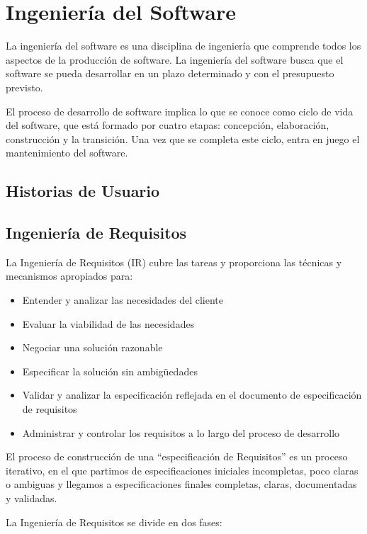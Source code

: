 \chapter{Ingeniería del Software}

La ingeniería del software es una disciplina de ingeniería que comprende todos los aspectos de la producción de software. La ingeniería del software busca que el software se pueda desarrollar en un plazo determinado y con el presupuesto previsto.

El proceso de desarrollo de software implica lo que se conoce como ciclo de vida del software, que está formado por cuatro etapas: concepción, elaboración, construcción y la transición. Una vez que se completa este ciclo, entra en juego el mantenimiento del software.


\section{Historias de Usuario}



\section{Ingeniería de Requisitos}

La Ingeniería de Requisitos (IR) cubre las tareas y proporciona las técnicas y mecanismos apropiados para:

\begin{itemize}
    \item Entender y analizar las necesidades del cliente
    \item Evaluar la viabilidad de las necesidades
    \item Negociar una solución razonable
    \item Especificar la solución sin ambigüedades
    \item Validar y analizar la especificación reflejada en el documento de especificación de requisitos
    \item Administrar y controlar los requisitos a lo largo del proceso de desarrollo
\end{itemize}

El proceso de construcción de una ``especificación de Requisitos'' es un proceso iterativo, en el que partimos de especificaciones iniciales incompletas, poco claras o ambiguas y llegamos a especificaciones finales completas, claras, documentadas y validadas.

La Ingeniería de Requisitos se divide en dos fases:

